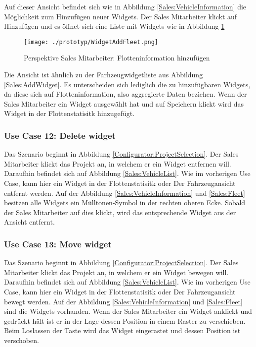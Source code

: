 Auf dieser Ansicht befindet sich wie in Abbildung \ref{Sales:VehicleInformation} die Möglichkeit zum Hinzufügen neuer Widgets. Der Sales Mitarbeiter klickt auf Hinzufügen und es öffnet sich eine Liste mit Widgets wie in Abbildung \ref{Sales:FleetWidget}

\begin{figure}[ht]
  \centering
  \texttt{[image: ./prototyp/WidgetAddFleet.png]}
  \caption{Perspektive Sales Mitarbeiter: Flotteninformation hinzufügen}
  \label{Sales:FleetWidget}
\end{figure}

Die Ansicht ist ähnlich zu der Farhzeugwidgetliste aus Abbildung \ref{Sales:AddWidget}. Es unterscheiden sich lediglich die zu hinzufügbaren Widgets, da diese sich auf Flotteninformation, also aggregierte Daten beziehen. Wenn der Sales Mitarbeiter ein Widget ausgewählt hat und auf Speichern klickt wird das Widget in der Flottenstatisitk hinzugefügt.


\subsubsection{Use Case 12: Delete widget}
Das Szenario beginnt in Abbildung \ref{Configurator:ProjectSelection}. Der Sales Mitarbeiter klickt das Projekt an, in welchem er ein Widget entfernen will. Daraufhin befindet sich auf Abbildung \ref{Sales:VehicleList}. Wie im vorherigen Use Case, kann hier ein Widget in der Flottenstatisitk oder Der Fahrzeugansicht entfernt werden. Auf der Abbildung \ref{Sales:VehicleInformation} und \ref{Sales:Fleet} besitzen alle Widgets ein Mülltonen-Symbol in der rechten oberen Ecke. Sobald der Sales Mitarbeiter auf dies klickt, wird das entsprechende Widget aus der Ansicht entfernt.

\subsubsection{Use Case 13: Move widget}
Das Szenario beginnt in Abbildung \ref{Configurator:ProjectSelection}. Der Sales Mitarbeiter klickt das Projekt an, in welchem er ein Widget bewegen will. Daraufhin befindet sich auf Abbildung \ref{Sales:VehicleList}. Wie im vorherigen Use Case, kann hier ein Widget in der Flottenstatisitk oder Der Fahrzeugansicht bewegt werden. Auf der Abbildung \ref{Sales:VehicleInformation} und \ref{Sales:Fleet} sind die Widgets vorhanden. Wenn der Sales Mitarbeiter ein Widget anklickt und gedrückt hält ist er in der Lage dessen Position in einem Raster zu verschieben. Beim Loslassen der Taste wird das Widget eingerastet und dessen Position ist verschoben.






